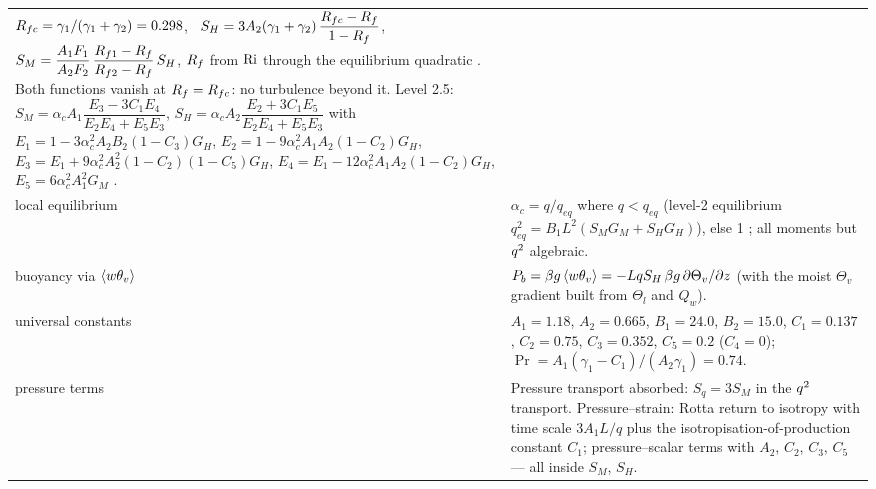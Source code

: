 \begin{xltabular}{\linewidth}{@{}>{\raggedright\arraybackslash}p{3.2cm} >{\raggedright\arraybackslash}X@{}}
$R_{fc} = \gamma_1/(\gamma_1 + \gamma_2) = 0.298$, \ $S_{H} = 3A_2(\gamma_1 + \gamma_2)\,\dfrac{R_{fc} - R_f}{1 - R_f}$, \ $S_M = \dfrac{A_1 F_1}{A_2 F_2}\,\dfrac{R_{f1} - R_f}{R_{f2} - R_f}\,S_H$,
$R_f$ from $\mathrm{Ri}$ through the equilibrium quadratic . Both functions vanish at $R_f = R_{fc}$: no turbulence beyond it.
Level 2.5: $S_M = \alpha_c A_1\dfrac{E_3 - 3C_1 E_4}{E_2 E_4 + E_5 E_3}$, $S_H = \alpha_c A_2\dfrac{E_2 + 3C_1 E_5}{E_2 E_4 + E_5 E_3}$ with
$E_1 = 1 - 3\alpha_c^2 A_2 B_2 (1 - C_3) G_H$, $E_2 = 1 - 9\alpha_c^2 A_1 A_2 (1 - C_2) G_H$, $E_3 = E_1 + 9\alpha_c^2 A_2^2 (1 - C_2)(1 - C_5) G_H$, $E_4 = E_1 - 12\alpha_c^2 A_1 A_2 (1 - C_2) G_H$, $E_5 = 6\alpha_c^2 A_1^2 G_M$ . \\
 local equilibrium & $\alpha_c = q/q_{eq}$ where $q < q_{eq}$ (level-2 equilibrium $q_{eq}^2 = B_1 L^2 (S_M G_M + S_H G_H)$), else 1 \parencite{helfand1988} ; all moments but $q^{2}$ algebraic. \\
 buoyancy via $\langle w\theta_v \rangle$ & $P_b = \beta g\,\langle w\theta_v \rangle = -L q S_H\,\beta g\,\partial \Theta_v/\partial z$ (with the moist $\Theta_v$ gradient built from $\Theta_l$ and $Q_w$). \\
 universal constants & $A_1 = 1.18$, $A_2 = 0.665$, $B_1 = 24.0$, $B_2 = 15.0$, $C_1 = 0.137$, $C_2 = 0.75$, $C_3 = 0.352$, $C_5 = 0.2$ ($C_4 = 0$); $\Pr = A_1(\gamma_1 - C_1)/(A_2\gamma_1) = 0.74$. \\
 pressure terms & Pressure transport absorbed: $S_q = 3S_M$ in the $q^{2}$ transport. Pressure--strain: Rotta return to isotropy with time scale $3A_1 L/q$ plus the isotropisation-of-production constant $C_1$; pressure--scalar terms with $A_2$, $C_2$, $C_3$, $C_5$ --- all inside $S_M$, $S_H$. \\
\end{xltabular}
\normalsize
\landscapeclose

\landscapeopen
